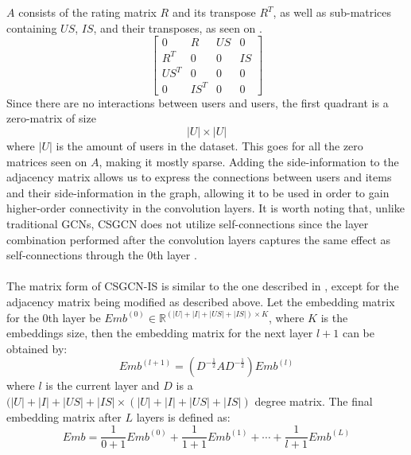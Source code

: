 $A$ consists of the rating matrix $R$ and its transpose $R^T$, as well as sub-matrices containing $US$, $IS$, and their transposes, as seen on .
\begin{equation}\label{csgcn_is_adj_mat}
    \begin{bmatrix}
    0 & R & US & 0\\
    R^T & 0 & 0 & IS\\
    US^T & 0 & 0 & 0 \\
    0 & IS^T & 0 & 0
    \end{bmatrix}
\end{equation}
Since there are no interactions between users and users, the first quadrant is a zero-matrix of size $$|U|\times|U|$$ where $|U|$ is the amount of users in the dataset.
This goes for all the zero matrices seen on $A$, making it mostly sparse.
Adding the side-information to the adjacency matrix allows us to express the connections between users and items and their side-information in the graph, allowing it to be used in order to gain higher-order connectivity in the convolution layers.
It is worth noting that, unlike traditional GCNs, CSGCN does not utilize self-connections since the layer combination performed after the convolution layers captures the same effect as self-connections through the 0th layer \cite{LightGCN}.
\\\\
The matrix form of CSGCN-IS is similar to the one described in \cite{LightGCN}, except for the adjacency matrix being modified as described above.
Let the embedding matrix for the 0th layer be $Emb^{(0)} \in \mathbb{R}^{(|U| + |I| + |US| + |IS|) \times K}$, where $K$ is the embeddings size, then the embedding matrix for the next layer $l+1$ can be obtained by:
\begin{equation}
    Emb^{(l+1)} = (D^{-\frac{1}{2}}AD^{-\frac{1}{2}})Emb^{(l)}
\end{equation}
where $l$ is the current layer and $D$ is a $(|U| + |I| + |US| + |IS| \times (|U| + |I| + |US| + |IS|)$ degree matrix. 
The final embedding matrix after $L$ layers is defined as:
\begin{equation}
    Emb = \frac{1}{0 +1}Emb^{(0)} + \frac{1}{1 +1}Emb^{(1)} + \cdots + \frac{1}{l +1}Emb^{(L)}
\end{equation}

